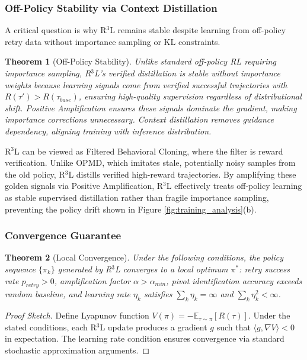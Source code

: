 \documentclass{article} %
\newtheorem{theorem}{Theorem}
\theoremstyle{definition}
\theoremstyle{remark}
\begin{document}
\subsubsection{Off-Policy Stability via Context Distillation}
\label{sec:context_distillation}

A critical question is why R$^3$L remains stable despite learning from off-policy retry data without importance sampling or KL constraints.

\begin{theorem}[Off-Policy Stability]
\label{thm:offpolicy_stability}
Unlike standard off-policy RL requiring importance sampling, R$^3$L's verified distillation is stable without importance weights because learning signals come from verified successful trajectories with $R(\tau') > R(\tau_{base})$, ensuring high-quality supervision regardless of distributional shift. Positive Amplification ensures these signals dominate the gradient, making importance corrections unnecessary. Context distillation removes guidance dependency, aligning training with inference distribution.
\end{theorem}

R$^3$L can be viewed as Filtered Behavioral Cloning, where the filter is reward verification. Unlike OPMD, which imitates stale, potentially noisy samples from the old policy, R$^3$L distills verified high-reward trajectories. By amplifying these golden signals via Positive Amplification, R$^3$L effectively treats off-policy learning as stable supervised distillation rather than fragile importance sampling, preventing the policy drift shown in Figure \ref{fig:training_analysis}(b).

\subsubsection{Convergence Guarantee}
\label{sec:convergence}

\begin{theorem}[Local Convergence]
\label{thm:convergence}
Under the following conditions, the policy sequence $\{\pi_k\}$ generated by R$^3$L converges to a local optimum $\pi^*$: retry success rate $p_{retry} > 0$, amplification factor $\alpha > \alpha_{min}$, pivot identification accuracy exceeds random baseline, and learning rate $\eta_k$ satisfies $\sum_k \eta_k = \infty$ and $\sum_k \eta_k^2 < \infty$.
\end{theorem}

\begin{proof}[Proof Sketch]
Define Lyapunov function $V(\pi) = -\mathbb{E}_{\tau \sim \pi}[R(\tau)]$. Under the stated conditions, each R$^3$L update produces a gradient $g$ such that $\langle g, \nabla V \rangle < 0$ in expectation. The learning rate condition ensures convergence via standard stochastic approximation arguments.
\end{proof}
\end{document}
